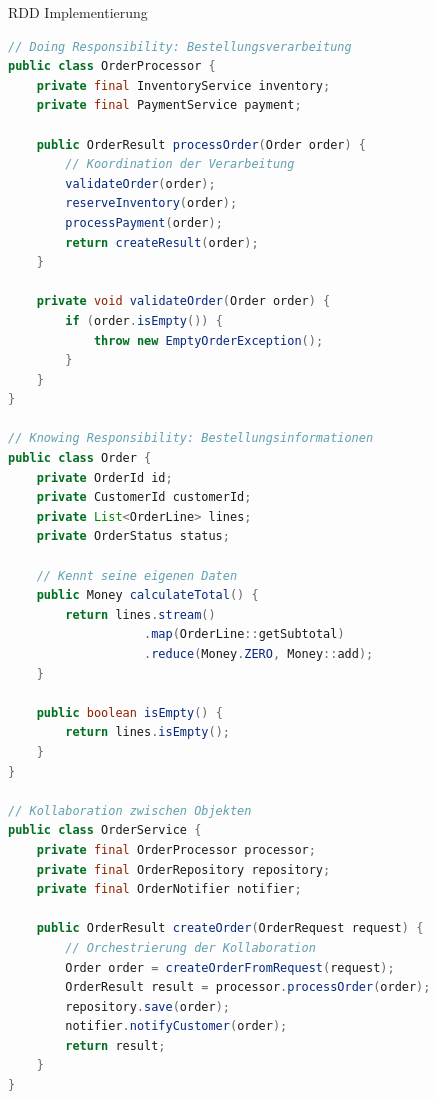 \begin{example2}{RDD Implementierung}
\begin{lstlisting}[language=Java, style=basesmol]
// Doing Responsibility: Bestellungsverarbeitung
public class OrderProcessor {
    private final InventoryService inventory;
    private final PaymentService payment;
    
    public OrderResult processOrder(Order order) {
        // Koordination der Verarbeitung
        validateOrder(order);
        reserveInventory(order);
        processPayment(order);
        return createResult(order);
    }
    
    private void validateOrder(Order order) {
        if (order.isEmpty()) {
            throw new EmptyOrderException();
        }
    }
}

// Knowing Responsibility: Bestellungsinformationen
public class Order {
    private OrderId id;
    private CustomerId customerId;
    private List<OrderLine> lines;
    private OrderStatus status;
    
    // Kennt seine eigenen Daten
    public Money calculateTotal() {
        return lines.stream()
                   .map(OrderLine::getSubtotal)
                   .reduce(Money.ZERO, Money::add);
    }
    
    public boolean isEmpty() {
        return lines.isEmpty();
    }
}

// Kollaboration zwischen Objekten
public class OrderService {
    private final OrderProcessor processor;
    private final OrderRepository repository;
    private final OrderNotifier notifier;
    
    public OrderResult createOrder(OrderRequest request) {
        // Orchestrierung der Kollaboration
        Order order = createOrderFromRequest(request);
        OrderResult result = processor.processOrder(order);
        repository.save(order);
        notifier.notifyCustomer(order);
        return result;
    }
}
\end{lstlisting}
\end{example2}




